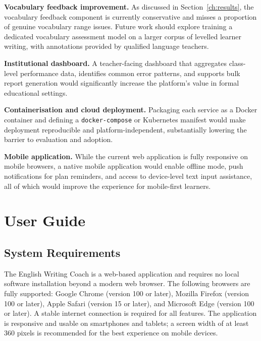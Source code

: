 \documentclass[12pt, a4paper]{report}
\begin{document}
\textbf{Vocabulary feedback improvement.} As discussed in Section~\ref{ch:results}, the vocabulary feedback component is currently conservative and misses a proportion of genuine vocabulary range issues. Future work should explore training a dedicated vocabulary assessment model on a larger corpus of levelled learner writing, with annotations provided by qualified language teachers.

\textbf{Institutional dashboard.} A teacher-facing dashboard that aggregates class-level performance data, identifies common error patterns, and supports bulk report generation would significantly increase the platform's value in formal educational settings.

\textbf{Containerisation and cloud deployment.} Packaging each service as a Docker container and defining a \texttt{docker-compose} or Kubernetes manifest would make deployment reproducible and platform-independent, substantially lowering the barrier to evaluation and adoption.

\textbf{Mobile application.} While the current web application is fully responsive on mobile browsers, a native mobile application would enable offline mode, push notifications for plan reminders, and access to device-level text input assistance, all of which would improve the experience for mobile-first learners.

\printbibliography[heading=bibintoc, title={References}]

\appendix

\chapter{User Guide}
\label{app:userguide}

\section{System Requirements}

The English Writing Coach is a web-based application and requires no local software installation beyond a modern web browser. The following browsers are fully supported: Google Chrome (version 100 or later), Mozilla Firefox (version 100 or later), Apple Safari (version 15 or later), and Microsoft Edge (version 100 or later). A stable internet connection is required for all features. The application is responsive and usable on smartphones and tablets; a screen width of at least 360 pixels is recommended for the best experience on mobile devices.
\end{document}
